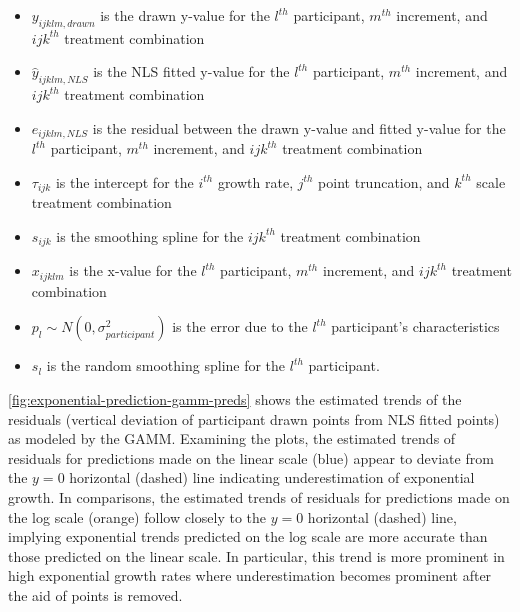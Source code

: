 \documentclass[print]{nuthesis}
\providecommand{\tightlist}{%
  \setlength{\itemsep}{0pt}\setlength{\parskip}{0pt}}
\begin{document}
\begin{itemize}
\tightlist
\item
  \(y_{ijklm,drawn}\) is the drawn y-value for the \(l^{th}\) participant, \(m^{th}\) increment, and \(ijk^{th}\) treatment combination
\item
  \(\hat y_{ijklm,NLS}\) is the NLS fitted y-value for the \(l^{th}\) participant, \(m^{th}\) increment, and \(ijk^{th}\) treatment combination
\item
  \(e_{ijklm,NLS}\) is the residual between the drawn y-value and fitted y-value for the \(l^{th}\) participant, \(m^{th}\) increment, and \(ijk^{th}\) treatment combination
\item
  \(\tau_{ijk}\) is the intercept for the \(i^{th}\) growth rate, \(j^{th}\) point truncation, and \(k^{th}\) scale treatment combination
\item
  \(s_{ijk}\) is the smoothing spline for the \(ijk^{th}\) treatment combination
\item
  \(x_{ijklm}\) is the x-value for the \(l^{th}\) participant, \(m^{th}\) increment, and \(ijk^{th}\) treatment combination
\item
  \(p_{l} \sim N(0, \sigma^2_{participant})\) is the error due to the \(l^{th}\) participant's characteristics
\item
  \(s_{l}\) is the random smoothing spline for the \(l^{th}\) participant.
\end{itemize}

\cref{fig:exponential-prediction-gamm-preds} shows the estimated trends of the residuals (vertical deviation of participant drawn points from NLS fitted points) as modeled by the GAMM.
Examining the plots, the estimated trends of residuals for predictions made on the linear scale (blue) appear to deviate from the \(y=0\) horizontal (dashed) line indicating underestimation of exponential growth.
In comparisons, the estimated trends of residuals for predictions made on the log scale (orange) follow closely to the \(y=0\) horizontal (dashed) line, implying exponential trends predicted on the log scale are more accurate than those predicted on the linear scale.
In particular, this trend is more prominent in high exponential growth rates where underestimation becomes prominent after the aid of points is removed.
\end{document}
